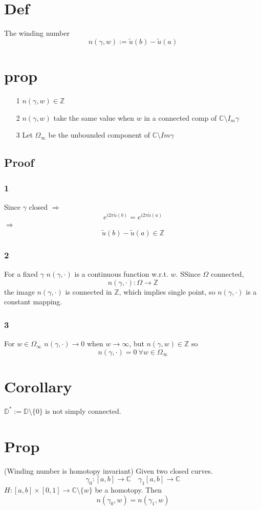 \documentclass{book}
\begin{document}
\section{Def}The winding number$$n(\gamma,w):=\tilde u(b)-\tilde u(a)$$
\section{prop}
\begin{itemize}
    \item[1] $n(\gamma,w)\in \mathbb Z$
    \item[2] $n(\gamma,w)$ take the same value when $w$ in a connected comp of $\mathbb C\setminus I_m\gamma$
    \item[3] Let $\Omega_\infty$ be the unbounded component of $\mathbb C\setminus Im\gamma$
\end{itemize}
\subsection*{Proof}
\subsubsection{1}Since $\gamma$ closed $\Rightarrow$$$e^{i2\pi\tilde u(b)}=e^{i2\pi\tilde u(a)}$$
$\Rightarrow$ $$\tilde u(b)-\tilde u(a)\in \mathbb Z$$
\subsubsection{2}
For a fixed $\gamma$ $n(\gamma,\cdot)$ is a continuous function w.r.t. $w$. SSince $\Omega$ connected, $$n(\gamma,\cdot):\Omega\to \mathbb Z$$the image $n(\gamma,\cdot)$ is connected in $\mathbb Z$, which implies single point, so $n(\gamma,\cdot)$ is a constant mapping.
\subsubsection{3}For $w\in \Omega_\infty$ $n(\gamma,\cdot)\to 0$ when $w\to \infty$, but $n(\gamma,w)\in \mathbb Z$ so $$n(\gamma,\cdot)=0\ \forall w\in \Omega_\infty$$
\section{Corollary}
$\mathbb D^*:=\mathbb D\setminus\{0\}$ is not simply connected.
\section{Prop}
(Winding number is homotopy invariant)
Given two closed curves.
$$\gamma_0:[a,b]\to\mathbb C\quad\gamma_1[a,b]\to\mathbb C$$
$H:[a,b]\times[0,1]\to \mathbb C\setminus\{w\}$ be a homotopy. Then$$n(\gamma_0,w)=n(\gamma_1,w)$$
\end{document}
